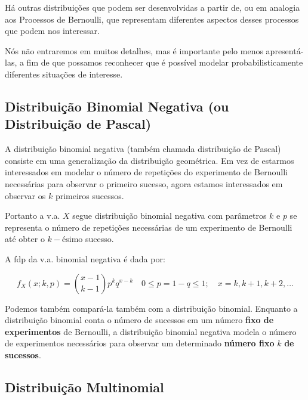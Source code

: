 \documentclass[
]{book}
\theoremstyle{definition}
\theoremstyle{definition}
\theoremstyle{definition}
\theoremstyle{remark}
\begin{document}
Há outras distribuições que podem ser desenvolvidas a partir de, ou em analogia aos Processos de Bernoulli, que representam diferentes aspectos desses processos que podem nos interessar.

Nós não entraremos em muitos detalhes, mas é importante pelo menos apresentá-las, a fim de que possamos reconhecer que é possível modelar probabilisticamente diferentes situações de interesse.

\hypertarget{distribuiuxe7uxe3o-binomial-negativa-ou-distribuiuxe7uxe3o-de-pascal}{%
\subsection*{Distribuição Binomial Negativa (ou Distribuição de Pascal)}\label{distribuiuxe7uxe3o-binomial-negativa-ou-distribuiuxe7uxe3o-de-pascal}}

A distribuição binomial negativa (também chamada distribuição de Pascal) consiste em uma generalização da distribuição geométrica. Em vez de estarmos interessados em modelar o número de repetições do experimento de Bernoulli necessárias para observar o primeiro sucesso, agora estamos interessados em observar os \(k\) primeiros sucessos.

Portanto a v.a. \(X\) segue distribuição binomial negativa com parâmetros \(k\) e \(p\) se representa o número de repetições necessárias de um experimento de Bernoulli até obter o \(k-\)ésimo sucesso.

A fdp da v.a. binomial negativa é dada por:

\[f_X(x; k, p) = \binom{x-1}{k-1} p^kq^{x-k} \quad 0 \leq p = 1-q \leq 1; \quad x = k, k+1, k+2, \ldots\]

Podemos também compará-la também com a distribuição binomial. Enquanto a distribuição binomial conta o número de sucessos em um número \textbf{fixo de experimentos} de Bernoulli, a distribuição binomial negativa modela o número de experimentos necessários para observar um determinado \textbf{número fixo} \(k\) \textbf{de sucessos}.

\hypertarget{distribuiuxe7uxe3o-multinomial}{%
\subsection*{Distribuição Multinomial}\label{distribuiuxe7uxe3o-multinomial}}
\end{document}
